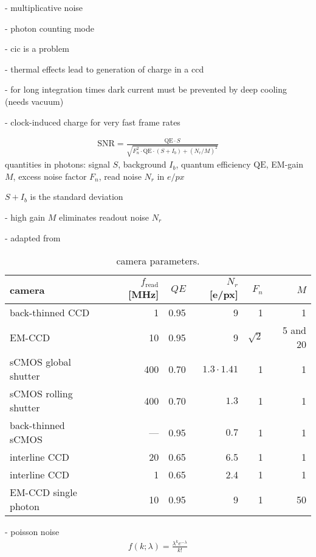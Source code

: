 - multiplicative noise

- photon counting mode

- cic is a problem

- thermal effects lead to generation of charge in a ccd

- for long integration times dark current must be prevented by deep cooling (needs vacuum)


- clock-induced charge for very fast frame rates


\citep{Robbins2003}
\begin{align}
  \textrm{SNR} = \frac{\textrm{QE}\cdot S}{\sqrt{F_n^2\cdot \textrm{QE} \cdot (S+I_b) + (N_r/M)^2}}
\end{align}
quantities in photons: signal $S$, background $I_b$, quantum
efficiency $\textrm{QE}$,  EM-gain $M$, excess noise factor $F_n$,
read noise $N_r$ in $e/px$

$S+I_b$ is the standard deviation

- high gain $M$ eliminates readout noise $N_r$

- adapted from \citep{Cameras2012}

\begin{table}[!htbp]
  \centering
  \begin{tabular}{l r r r r r}
    camera & $f_\textrm{read}$ [MHz] & $QE$ & $N_r$ [e/px] & $F_n$ & $M$ \\
    \hline
    back-thinned CCD & 1 & 0.95 & 9 & 1 & 1 \\
    EM-CCD & 10 & 0.95 & 9 & $\sqrt{2}$ & 5 and 20 \\
    sCMOS global shutter& 400 &0.70 & $1.3\cdot1.41$ & 1 & 1 \\
    sCMOS rolling shutter& 400 &0.70 & $1.3$ & 1 & 1 \\
    back-thinned sCMOS& --- &0.95 & $0.7$ & 1 & 1 \\
    interline CCD & 20 & 0.65 & 6.5 & 1 & 1\\
    interline CCD & 1 & 0.65 & 2.4 & 1 & 1\\
    EM-CCD single photon & 10 & 0.95 & 9 & 1 & 50 \\
  \end{tabular}
  \caption{camera parameters.}
  \label{tab:cam-param}
\end{table}



- poisson noise 
\begin{align}
  f(k;\lambda) = \frac{\lambda^k e^{-\lambda}}{k!}
\end{align}

